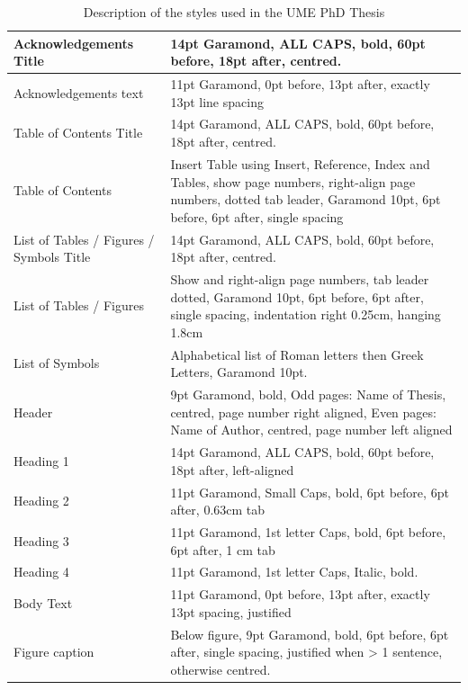 \begin{table}[hbtp]
  \centering
  \small
  \caption{Description of the styles used in the UME PhD Thesis}
    \begin{tabular}{|m{3cm}|m{9cm}|}
    \hline
    Acknowledgements Title & 14pt Garamond, ALL CAPS, bold, 60pt before, 18pt after, centred. \\
    \hline
    Acknowledgements text & 11pt Garamond, 0pt before, 13pt after, exactly 13pt line spacing \\
    \hline
    Table of Contents Title & 14pt Garamond, ALL CAPS, bold, 60pt before, 18pt after, centred. \\
    \hline
    Table of Contents & Insert Table using Insert, Reference, Index and Tables, show page numbers, right-align page numbers, dotted tab leader, Garamond 10pt, 6pt before, 6pt after, single spacing \\
    \hline
    List of Tables / Figures / Symbols Title & 14pt Garamond, ALL CAPS, bold, 60pt before, 18pt after, centred. \\
    \hline
    List of Tables / Figures & Show and right-align page numbers, tab leader dotted, Garamond 10pt, 6pt before, 6pt after, single spacing, indentation right 0.25cm, hanging 1.8cm \\
    \hline
    List of Symbols & Alphabetical list of Roman letters then Greek Letters, Garamond 10pt. \\
    \hline
    Header & 9pt Garamond, bold, Odd pages: Name of Thesis, centred, page number right aligned, Even pages: Name of Author, centred, page number left aligned \\
    \hline
    Heading 1 & 14pt Garamond, ALL CAPS, bold, 60pt before, 18pt after, left-aligned \\
    \hline
    Heading 2 & 11pt Garamond, Small Caps, bold, 6pt before, 6pt after,           0.63cm tab \\
    \hline
    Heading 3 & 11pt Garamond, 1st letter Caps, bold, 6pt before, 6pt after, 1 cm tab \\
    \hline
    Heading 4 & 11pt Garamond, 1st letter Caps, Italic, bold. \\
    \hline
    Body Text & 11pt Garamond, 0pt before, 13pt after, exactly 13pt spacing, justified \\
    \hline
    Figure caption & Below figure, 9pt Garamond, bold, 6pt before, 6pt after, single spacing, justified when > 1 sentence, otherwise centred. \\

\end{tabular}
\end{table}

